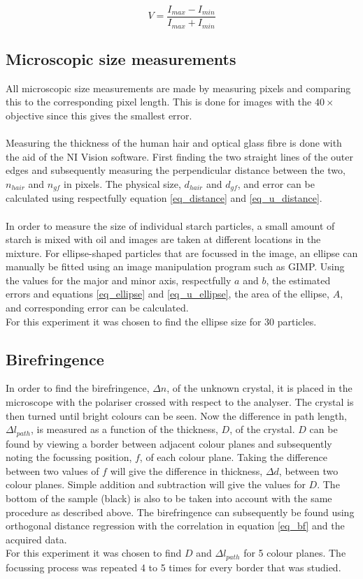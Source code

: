 \begin{equation}
  V = \frac{I_{max}-I_{min}}{I_{max}+I_{min}}
  \label{eq:visibility}
\end{equation}
\subsection{Microscopic size measurements}

All microscopic size measurements are made by measuring pixels and comparing this to the corresponding pixel length. This is done for images with the $40\times$ objective since this gives the smallest error.\\
\\
Measuring the thickness of the human hair and optical glass fibre is done with the aid of the NI Vision software. First finding the two straight lines of the outer edges and subsequently measuring the perpendicular distance between the two, $n_{hair}$ and $n_{gf}$ in pixels. The physical size, $d_{hair}$ and $d_{gf}$, and error can be calculated using respectfully equation \ref{eq_distance} and \ref{eq_u_distance}. \\
\\
In order to measure the size of individual starch particles, a small amount of starch is mixed with oil and images are taken at different locations in the mixture. For ellipse-shaped particles that are focussed in the image, an ellipse can manually be fitted using an image manipulation program such as GIMP. Using the values for the major and minor axis, respectfully $a$ and $b$, the estimated errors and equations \ref{eq_ellipse} and \ref{eq_u_ellipse}, the area of the ellipse, $A$, and corresponding error can be calculated.\\
For this experiment it was chosen to find the ellipse size for 30 particles.


\subsection{Birefringence}

In order to find the birefringence, $\Delta n$, of the unknown crystal, it is placed in the microscope with the polariser crossed with respect to the analyser. The crystal is then turned until bright colours can be seen. Now the difference in path length, $\Delta l_{path}$, is measured as a function of the thickness, $D$, of the crystal. $D$ can be found by viewing a border between adjacent colour planes and subsequently noting the focussing position, $f$, of each colour plane. Taking the difference between two values of $f$ will give the difference in thickness, $\Delta d$, between two colour planes. Simple addition and subtraction will give the values for $D$. The bottom of the sample (black) is also to be taken into account with the same procedure as described above. The birefringence can subsequently be found using orthogonal distance regression with the correlation in equation \ref{eq_bf} and the acquired data.\\
For this experiment it was chosen to find $D$ and $\Delta l_{path}$ for 5 colour planes. The focussing process was repeated 4 to 5 times for every border that was studied.

